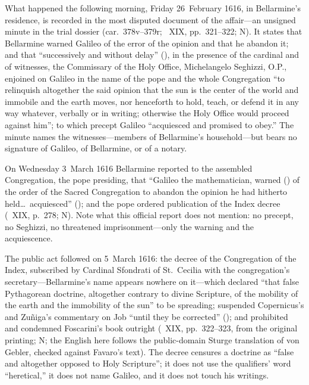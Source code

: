 What happened the following morning, Friday 26~February 1616, in
Bellarmine's residence, is recorded in the most disputed document
of the affair---an unsigned minute in the trial dossier (car.\
378v--379r; ~XIX, pp.~321--322; N). It states that
Bellarmine warned Galileo of the error of the opinion and that he
abandon it; and that ``successively and without delay''
(), in the presence of the
cardinal and of witnesses, the Commissary of the Holy Office,
Michelangelo Seghizzi, O.P., enjoined on Galileo in the name of the
pope and the whole Congregation ``to relinquish altogether the
said opinion that the sun is the center of the world and immobile
and the earth moves, nor henceforth to hold, teach, or defend it
in any way whatever, verbally or in writing; otherwise the Holy
Office would proceed against him''; to which precept Galileo
``acquiesced and promised to obey.'' The minute names the
witnesses---members of Bellarmine's household---but bears no
signature of Galileo, of Bellarmine, or of a notary.

On Wednesday 3~March 1616 Bellarmine reported to the assembled
Congregation, the pope presiding, that ``Galileo the mathematician,
warned (\latin{monitus}) of the order of the Sacred Congregation
to abandon the opinion he had hitherto held\ldots\ acquiesced''
(); and the pope ordered publication of the
Index decree (~XIX, p.~278; N). Note what this
official report does not mention: no precept, no Seghizzi, no
threatened imprisonment---only the warning and the acquiescence.

The public act followed on 5~March 1616: the decree of the
Congregation of the Index, subscribed by Cardinal Sfondrati of
St.~Cecilia with the congregation's secretary---Bellarmine's name
appears nowhere on it---which declared ``that false Pythagorean doctrine, altogether contrary to
divine Scripture, of the mobility of the earth and the immobility
of the sun'' to be spreading; suspended Copernicus's  and Zu\~niga's commentary on Job ``until they be
corrected'' (\latin{donec corrigantur}); and prohibited and
condemned Foscarini's book outright (~XIX,
pp.~322--323, from the original printing; N; the English here
follows the public-domain Sturge translation of von Gebler,
checked against Favaro's text). The decree censures a doctrine as
``false and altogether opposed to Holy Scripture''; it does not
use the qualifiers' word ``heretical,'' it does not name Galileo,
and it does not touch his writings.

